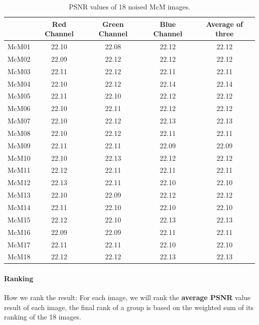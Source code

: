 \documentclass[a4paper,11pt]{article}
\begin{document}
\begin{table}[h]
\centering
\caption{PSNR values of 18 noised McM images.}
\label{tab:noisy_task3}
\begin{tabular}{|c|c|c|c|c|}
\hline
 & Red Channel & Green Channel & Blue Channel & Average of three \\ \hline
McM01 & 22.10 & 22.08 & 22.12 & 22.12 \\ \hline
McM02 & 22.09 & 22.12 & 22.12 & 22.12 \\ \hline
McM03 & 22.11 & 22.12 & 22.11 & 22.11 \\ \hline
McM04 & 22.10 & 22.12 & 22.14 & 22.14 \\ \hline
McM05 & 22.11 & 22.10 & 22.12 & 22.12 \\ \hline
McM06 & 22.10 & 22.11 & 22.12 & 22.12 \\ \hline
McM07 & 22.10 & 22.12 & 22.13 & 22.13 \\ \hline
McM08 & 22.10 & 22.12 & 22.11 & 22.11 \\ \hline
McM09 & 22.11 & 22.11 & 22.09 & 22.09 \\ \hline
McM10 & 22.10 & 22.13 & 22.12 & 22.12 \\ \hline
McM11 & 22.12 & 22.11 & 22.11 & 22.11 \\ \hline
McM12 & 22.13 & 22.11 & 22.10 & 22.10 \\ \hline
McM13 & 22.10 & 22.09 & 22.12 & 22.12 \\ \hline
McM14 & 22.11 & 22.10 & 22.10 & 22.10 \\ \hline
McM15 & 22.12 & 22.10 & 22.13 & 22.13 \\ \hline
McM16 & 22.09 & 22.09 & 22.11 & 22.11 \\ \hline
McM17 & 22.11 & 22.11 & 22.10 & 22.10 \\ \hline
McM18 & 22.12 & 22.12 & 22.13 & 22.13 \\ \hline
\end{tabular}
%
\end{table}

\paragraph{Ranking} 
How we rank the result: For each image, we will rank the {\bf average PSNR} value result of each image, the final rank of a group is based on the weighted sum of its ranking of the 18 images. 


\clearpage
\end{document}
